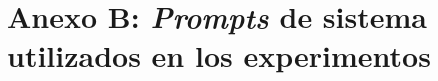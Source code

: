 \chapter*{Anexo B: \textit{Prompts} de sistema utilizados en los experimentos}
\label{anexo:system_promts}

